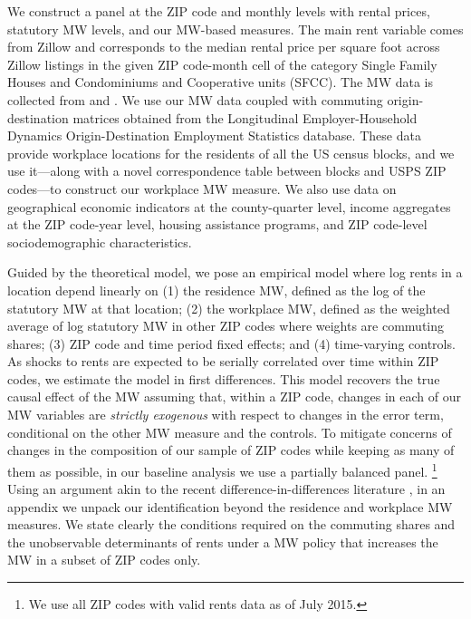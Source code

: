 We construct a panel at the ZIP code and monthly levels with rental prices, 
statutory MW levels, and our MW-based measures.
The main rent variable comes from Zillow and corresponds to the median 
rental price per square foot across Zillow listings in the given ZIP 
code-month cell of the category Single Family Houses and Condominiums and 
Cooperative units (SFCC).
The MW data is collected from \textcite{VaghulZipperer2016} and 
\textcite{BerkeleyLaborCenter}.
We use our MW data coupled with commuting origin-destination matrices obtained 
from the Longitudinal Employer-Household Dynamics Origin-Destination Employment 
Statistics \parencite[LODES;][]{CensusLODES} database.
These data provide workplace locations for the residents of all the US census 
blocks, and we use it---along with a novel correspondence table between blocks 
and USPS ZIP codes---to construct our workplace MW measure.
We also use data on 
geographical economic indicators at the county-quarter level, 
income aggregates at the ZIP code-year level,
housing assistance programs, and 
ZIP code-level sociodemographic characteristics.


Guided by the theoretical model, we pose an empirical model where log rents in 
a location depend linearly on
(1) the residence MW, defined as the log of the statutory MW at that location;
(2) the workplace MW, defined as the weighted average of log statutory MW in other 
ZIP codes where weights are commuting shares;
(3) ZIP code and time period fixed effects;
and 
(4) time-varying controls.
As shocks to rents are expected to be serially correlated over time within ZIP 
codes, we estimate the model in first differences.
This model recovers the true causal effect of the MW assuming that, 
within a ZIP code, changes in each of our MW variables are 
\textit{strictly exogenous} with respect to changes in the error 
term, conditional on the other MW measure and the controls.
To mitigate concerns of changes in the composition of our sample of ZIP codes 
while keeping as many of them as possible, in our baseline analysis we use a 
partially balanced panel.%
\footnote{We use all ZIP codes with valid rents data as of July 2015.}
Using an argument akin to the recent difference-in-differences literature
\parencite[e.g.,][]{CallawayEtAl2021}, 
in an appendix we unpack our identification beyond the residence and
workplace MW measures.
We state clearly the conditions required on the commuting shares and the 
unobservable determinants of rents under a MW policy that increases the MW in 
a subset of ZIP codes only.

